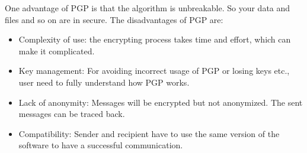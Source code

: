 One advantage of PGP is that the algorithm is unbreakable. So your data and files and so on are in secure.
The disadvantages of PGP are:
\begin{itemize}
	\item Complexity of use: the encrypting process takes time and effort, which can make it complicated. 
	\item Key management: For avoiding incorrect usage of PGP or losing keys etc., user need to fully understand how PGP works. 
	\item Lack of anonymity: Messages will be encrypted but not anonymized. The sent messages can be traced back. 
	\item Compatibility: Sender and recipient have to use the same version of the software to have a successful communication. 

\end{itemize}



